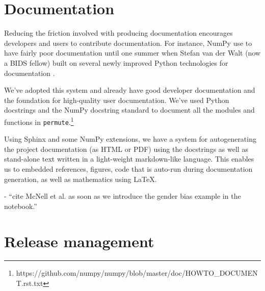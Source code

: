 %
%
%
%
%
%

\section{\label{sec:doc}Documentation}

Reducing the friction involved with producing documentation encourages
developers and users to contribute documentation.  For instance, NumPy use to
have fairly poor documentation until one summer when Stefan van der Walt (now a
BIDS fellow) built on several newly improved Python technologies for
documentation \cite{SciPyProceedings_27}.

We've adopted this system and already have good developer documentation and the
foundation for high-quality user documentation. We've used Python docstrings and
the NumPy docstring standard to document all the modules and functions in
\texttt{permute}.\footnote{https://github.com/numpy/numpy/blob/master/doc/HOWTO\_DOCUMENT.rst.txt}

Using Sphinx and some NumPy extensions, we have a system for autogenerating the
project documentation (as HTML or PDF) using the docstrings as well as
stand-alone text written in a light-weight markdown-like language.  This
enables us to embedded references, figures, code that is auto-run during
documentation generation, as well as mathematics using \LaTeX.

- ``cite McNell et al. as soon as we introduce the gender bias example in the notebook.''

\cite{macnell2014s}

\section{\label{sec:release}Release management}

